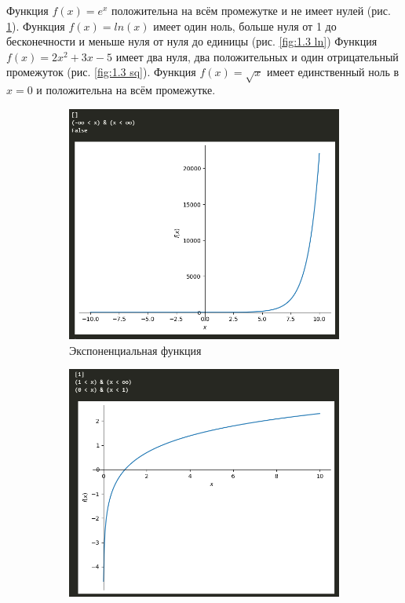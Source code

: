 \documentclass[14pt,a4paper]{extarticle}
\begin{document}
Функция $f(x)=e^x$ положительна на всём промежутке и не имеет нулей (рис. \ref{fig:1.3 exp}).
Функция $f(x)=ln(x)$ имеет один ноль, больше нуля от 1 до бесконечности
и меньше нуля от нуля до единицы (рис. \ref{fig:1.3 ln})
Функция $f(x)=2x^2+3x-5$ имеет два нуля, два положительных и один
отрицательный промежуток (рис. \ref{fig:1.3 sq}).
Функция $f(x)=\sqrt x$ имеет единственный ноль в $x=0$ и положительна на всём промежутке.

\newpage
\begin{figure}[!ht]
    \begin{subfigure}{0.5\textwidth}
        \centering
        \includegraphics[width=0.9\linewidth]{figures/1.3-1.png}
        \caption{Экспоненциальная функция}
        \label{fig:1.3 exp}
    \end{subfigure}
    \begin{subfigure}{0.5\textwidth}
        \centering
        \includegraphics[width=0.9\linewidth]{figures/1.3 ln.png}

\end{subfigure}
\end{figure}
\end{document}
